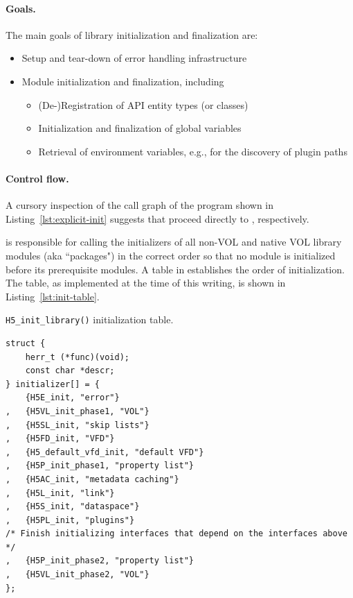 \paragraph{Goals.} The main goals of library initialization and finalization are:

\begin{itemize}
    \item Setup and tear-down of error handling infrastructure
    \item Module initialization and finalization, including
    \begin{itemize}
        \item (De-)Registration of API entity types (or classes)
        \item Initialization and finalization of global variables
        \item Retrieval of environment variables, e.g., for the discovery of plugin paths
    \end{itemize}
\end{itemize}

\paragraph{Control flow.} A cursory inspection of the call graph of the program shown in Listing~\ref{lst:explicit-init} suggests that  proceed directly to , respectively.

 is responsible for calling the initializers of all non-VOL and native VOL library modules (aka ``packages") in the correct order so that no module is initialized before its prerequisite modules. A table in  establishes the order of initialization. The table, as implemented at the time of this writing, is shown in Listing~\ref{lst:init-table}.

\begin{listing}
\centering
\caption{\texttt{H5\_init\_library()} initialization table.}
\label{lst:init-table}
\begin{verbatim}
struct {
    herr_t (*func)(void);
    const char *descr;
} initializer[] = {
    {H5E_init, "error"}
,   {H5VL_init_phase1, "VOL"}
,   {H5SL_init, "skip lists"}
,   {H5FD_init, "VFD"}
,   {H5_default_vfd_init, "default VFD"}
,   {H5P_init_phase1, "property list"}
,   {H5AC_init, "metadata caching"}
,   {H5L_init, "link"}
,   {H5S_init, "dataspace"}
,   {H5PL_init, "plugins"}
/* Finish initializing interfaces that depend on the interfaces above */
,   {H5P_init_phase2, "property list"}
,   {H5VL_init_phase2, "VOL"}
};
\end{verbatim}
\end{listing}

